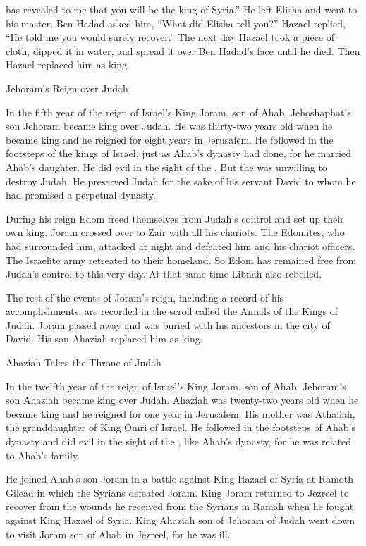 {{}
has revealed
to me
that you
will be the king
of Syria.”
He left
Elisha
and went
to his master.
Ben Hadad asked
him, “What
did Elisha
tell
you?” Hazael replied,
“He told
me you would surely
recover.”
The next
day Hazael took
a piece of cloth,
dipped
it in water,
and spread
it over
Ben Hadad’s face
until he died.
Then Hazael
replaced
him as king.
\par }{\SH Jehoram’s Reign over Judah
\par }{\PP {}In the fifth
year
of the reign
of Israel’s
King
Joram,
son
of Ahab,
Jehoshaphat’s
son
Jehoram
became king over
Judah.
He was thirty-two
years
old when he became
king and he reigned
for eight
years
in Jerusalem.
He followed
in the footsteps
of the kings
of Israel,
just
as Ahab’s
dynasty
had done,
for
he married
Ahab’s
daughter.
He did
evil
in the sight
of the
{}.
But the
{}
was unwilling
to destroy
Judah.
He preserved Judah
for the sake
of his servant
David
to whom
he had promised
a perpetual
dynasty.
\par }{\PP {}During
his reign Edom
freed
themselves from Judah’s
control and set up
their own king.
Joram
crossed
over to Zair
with all
his chariots.
The Edomites,
who had surrounded
him,
attacked
at night
and defeated
him
and his chariot
officers.
The Israelite army
retreated
to their homeland.
So Edom
has remained free
from
Judah’s
control
to
this very day.
At that same time
Libnah
also rebelled.
\par }{\PP {}The rest
of the events
of Joram’s
reign, including
a record
of his accomplishments,
are recorded
in the scroll
called the Annals
of the Kings
of Judah.
Joram
passed away
and was buried
with
his ancestors
in the city
of David.
His son
Ahaziah
replaced
him as king.
\par }{\SH Ahaziah Takes the Throne of Judah
\par }{\PP {}In the twelfth
year
of the reign
of Israel’s
King
Joram,
son
of Ahab,
Jehoram’s
son
Ahaziah
became king
over Judah.
Ahaziah
was twenty-two
years
old
when he became king
and he reigned
for one
year
in Jerusalem.
His mother
was
Athaliah,
the granddaughter
of King
Omri
of Israel.
He followed
in the footsteps
of Ahab’s
dynasty
and did
evil
in the sight
of the
{}, like Ahab’s
dynasty,
for
he was
related
to Ahab’s
family.
\par }{\PP {}He joined
Ahab’s
son
Joram
in a battle
against
King
Hazael
of Syria
at Ramoth
Gilead
in which the Syrians
defeated
Joram.
King
Joram
returned
to Jezreel
to recover
from
the wounds
he received
from the Syrians
in Ramah
when he fought
against King
Hazael
of Syria.
King
Ahaziah
son
of Jehoram
of Judah
went down
to visit
Joram
son
of Ahab
in Jezreel,
for
he was ill.

}
